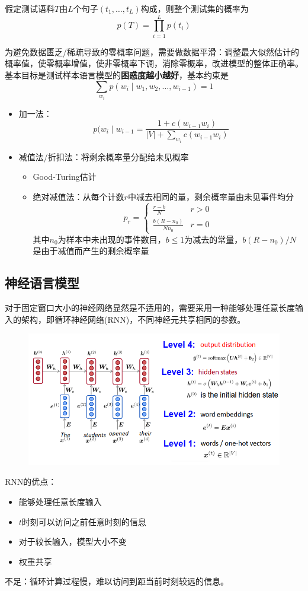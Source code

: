 \begin{definition}
假定测试语料$T$由$L$个句子$(t_1,\ldots,t_L)$构成，则整个测试集的概率为
\[p(T)=\prod_{i=1}^Lp(t_i)\]
\end{definition}

为避免数据匮乏/稀疏导致的零概率问题，需要做数据平滑：调整最大似然估计的概率值，使零概率增值，使非零概率下调，消除零概率，改进模型的整体正确率。
基本目标是测试样本语言模型的\textbf{困惑度越小越好}，基本约束是
\[\sum_{w_i}p(w_i\mid w_1,w_2,\ldots,w_{i-1})=1\]
\begin{itemize}
	\item 加一法：
	\[p(w_i\mid w_{i-1}=\frac{1+c(w_{i-1}w_i)}{|V|+\sum_{w_i}c(w_{i-1}w_i)}\]
	\item 减值法/折扣法：将剩余概率量分配给未见概率
	\begin{itemize}
		\item Good-Turing估计
		\item 绝对减值法：从每个计数$r$中减去相同的量，剩余概率量由未见事件均分
		\[p_r=\begin{cases}
		\frac{r-b}{N} & r>0\\
		\frac{b(R-n_0)}{Nn_0} & r=0
		\end{cases}\]
		其中$n_0$为样本中未出现的事件数目，$b\leq 1$为减去的常量，$b(R-n_0)/N$是由于减值而产生的剩余概率量
	\end{itemize}
\end{itemize}

\subsection{神经语言模型}
对于固定窗口大小的神经网络显然是不适用的，需要采用一种能够处理任意长度输入的架构，即循环神经网络(RNN)，不同神经元共享相同的参数。
\begin{figure}[H]
\centering
\includegraphics[width=0.6\linewidth]{fig/RNN.png}
\end{figure}

RNN的优点：
\begin{itemize}
	\item 能够处理任意长度输入
	\item $t$时刻可以访问之前任意时刻的信息
	\item 对于较长输入，模型大小不变
	\item 权重共享
\end{itemize}

不足：循环计算过程慢，难以访问到距当前时刻较远的信息。